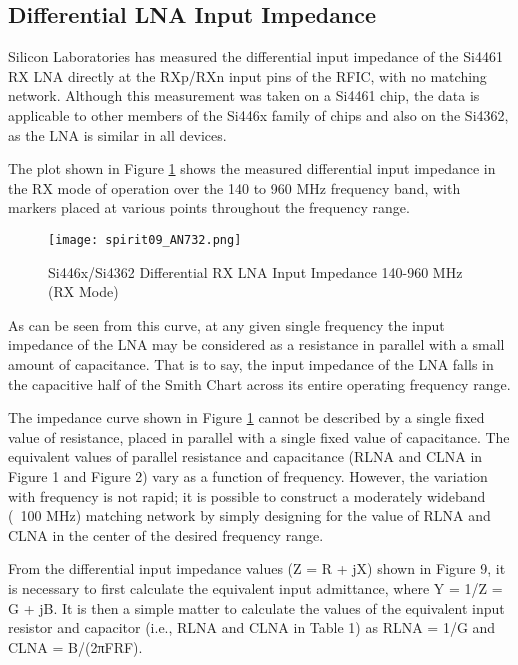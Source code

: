     \subsection{Differential LNA Input Impedance} 
      Silicon Laboratories has measured the differential input impedance of the Si4461 RX LNA 
      directly at the RXp/RXn input pins of the RFIC, with no matching network. Although this 
      measurement was taken on a Si4461 chip, the data is applicable to other members of the Si446x 
      family of chips and also on the Si4362, as the LNA is similar in all devices.
      
      The plot shown in Figure \ref{EXP001:fig_spirit09} shows the measured differential input 
      impedance in the RX mode of operation over the 140 to 960 MHz frequency band, with markers 
      placed at various points throughout the frequency range.
      
      \begin{figure}[ht!]  %
        \centering
        \texttt{[image: spirit09\_AN732.png]}
        \caption{Si446x/Si4362 Differential RX LNA Input Impedance 140-960 MHz (RX Mode) 
                 \cite[s.~4]{AN643SiliconLabs}}
        \label{EXP001:fig_spirit09}
      \end{figure}
       
      As can be seen from this curve, at any given single frequency the input impedance of the LNA 
      may be considered as a resistance in parallel with a small amount of capacitance. That is to 
      say, the input impedance of the LNA falls in the capacitive half of the Smith Chart across 
      its entire operating frequency range.
      
      The impedance curve shown in Figure \ref{EXP001:fig_spirit09} cannot be described by a single 
      fixed value of resistance, placed in parallel with a single fixed value of capacitance. The 
      equivalent values of  parallel resistance and capacitance (RLNA and CLNA in Figure 1 and 
      Figure 2) vary as a function of frequency. However, the variation with frequency is not 
      rapid; it is possible to construct a moderately wideband (~100 MHz) matching network by 
      simply designing for the value of RLNA and CLNA in the center of the desired frequency range.
      
      From the differential input impedance values (Z = R + jX) shown in Figure 9, it is necessary 
      to first calculate the equivalent input admittance, where Y = 1/Z = G + jB. It is then a 
      simple matter to calculate the values of the equivalent input resistor and capacitor (i.e., 
      RLNA and CLNA in Table 1) as RLNA = 1/G and CLNA = B/(2πFRF).
     
